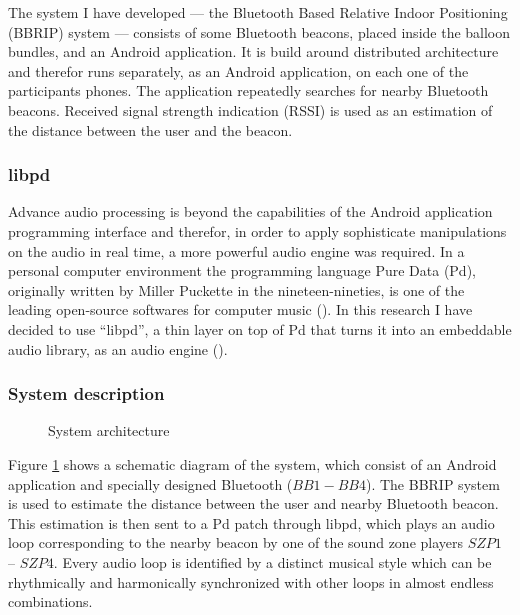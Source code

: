 \documentclass[a4paper,11pt]{article}
\begin{document}
The system I have developed --- the Bluetooth Based Relative Indoor Positioning (BBRIP) system --- consists of some Bluetooth beacons, placed inside the balloon bundles, and an Android application.
It is build around distributed architecture and therefor runs separately, as an Android application, on each one of the participants phones.
The application repeatedly searches for nearby Bluetooth beacons.
Received signal strength indication (RSSI) is used as an estimation of the distance between the user and the beacon.

\subsubsection{libpd}\label{methods:libpd}

Advance audio processing is beyond the capabilities of the Android application programming interface and therefor, in order to apply sophisticate manipulations on the audio in real time, a more powerful audio engine was required.
In a personal computer environment the programming language Pure Data (Pd), originally written by Miller Puckette in the nineteen-nineties, is one of the leading open-source softwares for computer music (\citeauthor{web:pd}).
In this research I have decided to use ``libpd'', a thin layer on top of Pd that turns it into an embeddable audio library, as an audio engine (\cite[p. v]{brinkmann12}).

\subsubsection{System description}\label{systemdescription}

\begin{figure}[!htb]
	\centering
	\def\svgwidth{0.9\textwidth}
	
	\caption{System architecture}\label{fig:sys:architecture}
\end{figure}

Figure \ref{fig:sys:architecture} shows a schematic diagram of the system, which consist of an Android application and specially designed Bluetooth ($BB1 - BB4$).
The BBRIP system is used to estimate the distance between the user and nearby Bluetooth beacon.
This estimation is then sent to a Pd patch through libpd, which plays an audio loop corresponding to the nearby beacon by one of the sound zone players $SZP1$ -- $SZP4$.
Every audio loop is identified by a distinct musical style which can be rhythmically and harmonically synchronized with other loops in almost endless combinations.
\end{document}
